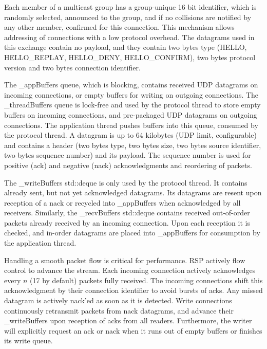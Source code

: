 \documentclass[10pt,journal,compsoc]{IEEEtran}
\begin{document}
Each member of a multicast group has a group-unique 16 bit identifier, which is
randomly selected, announced to the group, and if no collisions are notified by
any other member, confirmed for this connection. This mechanism allows
addressing of connections with a low protocol overhead. The datagrams used in
this exchange contain no payload, and they contain two bytes type (HELLO,
HELLO\_REPLAY, HELLO\_DENY, HELLO\_CONFIRM), two bytes protocol version and two
bytes connection identifier.

The \textsf{\_appBuffers} queue, which is blocking, contains received UDP
datagrams on incoming connections, or empty buffers for writing on outgoing
connections. The \textsf{\_threadBuffers} queue is lock-free and used by the
protocol thread to store empty buffers on incoming connections, and pre-packaged
UDP datagrams on outgoing connections. The application thread pushes buffers
into this queue, consumed by the protocol thread. A datagram is up to 64
kilobytes (UDP limit, configurable) and contains a header (two bytes type, two
bytes size, two bytes source identifier, two bytes sequence number) and its
payload. The sequence number is used for positive (ack) and negative (nack)
acknowledgments and reordering of packets.

The \textsf{\_writeBuffers std::deque} is only used by the protocol
thread. It contains already sent, but not yet acknowledged datagrams. Its
datagrams are resent upon reception of a nack or recycled into
\textsf{\_appBuffers} when acknowledged by all receivers. Similarly, the
\textsf{\_recvBuffers std::deque} contains received out-of-order packets already
received by an incoming connection. Upon each reception it is checked, and
in-order datagrams are placed into \textsf{\_appBuffers} for consumption by the
application thread.

Handling a smooth packet flow is critical for performance. RSP actively flow
control to advance the stream. Each incoming connection actively acknowledges
every $n$ (17 by default) packets fully received. The incoming connections shift
this acknowledgment by their connection identifier to avoid bursts of acks. Any
missed datagram is actively nack'ed as soon as it is detected. Write connections
continuously retransmit packets from nack datagrams, and advance their
\textsf{\_writeBuffers} upon reception of acks from all readers. Furthermore,
the writer will explicitly request an ack or nack when it runs out of empty
buffers or finishes its write queue.
\end{document}
